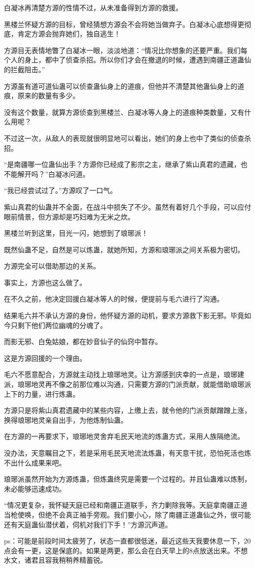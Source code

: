 \begin{this_body}
白凝冰再清楚方源的性情不过，从未准备得到方源的救援。

黑楼兰怀疑方源的目标，曾经猜想方源会不会将她当做弃子。白凝冰心底想得更彻底，肯定方源会抛弃她们，独自逃生！

方源目无表情地瞥了白凝冰一眼，淡淡地道：“情况比你想象的还要严重。我们每个人的身上，都中了侦查杀招。所以你们才会在撤退的时候，遭遇到南疆正道蛊仙的拦截阻击。”

方源虽有道可道仙蛊可以侦查蛊仙身上的道痕，但他并不清楚其他蛊仙身上的道痕，原来的数量有多少。

没有这个数量，就算方源侦查到黑楼兰、白凝冰等人身上的道痕种类数量，又有什么用呢？

不过这一次，从敌人的表现就很明显地可以看出，她们的身上也中了类似的侦查杀招。

“是南疆哪一位蛊仙出手？方源你已经成了影宗之主，继承了紫山真君的遗藏，也不能解开吗？”白凝冰问道。

“我已经尝试过了。”方源叹了一口气。

紫山真君的仙蛊并不全面，在战斗中损失了不少。虽然有着好几个手段，可以应付眼前情景，但方源却是巧妇难为无米之炊。

黑楼兰听到这里，目光一闪，她想到了琅琊派！

既然仙蛊不足，自然是可以炼蛊，就她所知，方源和琅琊派之间关系极为密切。

方源完全可以借助那边的关系。

事实上，方源也这么做了。

在不久之前，他决定回援白凝冰等人的时候，便提前与毛六进行了沟通。

结果毛六并不承认方源的身份，他怀疑方源的动机，要求方源救下影无邪。毕竟如今只剩下他们两位幽魂的分魂了。

而影无邪、白兔姑娘，都在妙音仙子的仙窍中暂存。

这是方源回援的一个理由。

毛六不愿意配合，方源就主动找上琅琊地灵。让方源感到庆幸的一点是，琅琊建派，琅琊地灵再不像之前那位难以沟通，只需要方源的门派贡献，就能借助琅琊派上下的力量，进行炼蛊。

方源只是将紫山真君遗藏中的某些内容，上缴上去，就令他的门派贡献蹭蹭上涨，换得琅琊地灵亲自出手，为他炼制仙蛊。

在方源的一再要求下，琅琊地灵舍弃毛民天地流的炼蛊方式，采用人族隔绝流。

没办法，天意瞩目之下，若是采用毛民天地流法炼蛊，有天意干扰，恐怕死活也炼不出什么成果来吧。

琅琊派虽然开始为方源炼蛊，但炼蛊终究是需要一个过程的。并且仙蛊难以炼制，未必能够迅速成功。

“情况更复杂，我怀疑天庭已经和南疆正道联手，齐力剿除我等。天庭拿南疆正道当枪使唤，但绝不会真正袖手旁观。我们要小心，除了南疆正道蛊仙之外，很可能还有天庭蛊仙潜伏着，伺机对我们下手！”方源沉声道。

ps：可能是前段时间太疲劳了，状态一直都很低迷，最近这些天我要休息一下，20点会有一更，这是保底的。如果是两更，那么会在白天早上的8点放送出来。不想水文，诸君且容我稍稍养精蓄锐。

\end{this_body}

